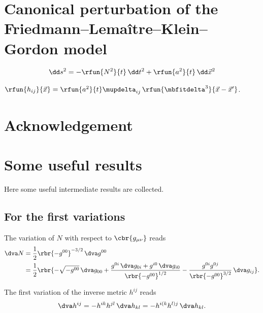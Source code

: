 \documentclass[a4paper,11pt]{article}
\begin{document}
\section{Canonical perturbation of the Friedmann--Lema\^itre--Klein--Gordon 
model}


\begin{align}
\dd s^2 = -\rfun{N^2}{t}\,\dd t^2 + \rfun{a^2}{t}\,\dd \vec{x}^2
\end{align}

$\rfun{h_{ij}}{\vec{x}} = \rfun{a^2}{t}\mupdelta_{ij}\,
\rfun{\mbfitdelta^3}{\vec{x}-\vec{x}'}$.


\section*{Acknowledgement}


\appendix

\section{Some useful results}
\label{sec:useful-results}

Here some useful intermediate results are collected.

\subsection{For the first variations}
\label{ssec:first-var}

The variation of $N$ with respect to $\cbr{g_{\mu\nu}}$ reads
\begin{align}
\dva N &= \frac{1}{2}\rbr{-g^{00}}^{-3/2}\,\dva g^{00}
\\
&= \frac{1}{2}\rbr{-\sqrt{-g^{00}}\,\dva g_{00}
+\frac{g^{0i}\,\dva g_{0i}+g^{i0}\,\dva g_{i0}}{\rbr{-g^{00}}^{1/2}}
-\frac{g^{0i}g^{0j}}{\rbr{-g^{00}}^{3/2}}\,\dva g_{ij}}.
\end{align}

The first variation of the inverse metric $h^{ij}$ reads
\begin{align}
\dva h^{ij} = -h^{ik}h^{jl}\,\dva h_{kl} = - h^{i(k}h^{l)j}\,\dva h_{kl}.
\end{align}
\end{document}
